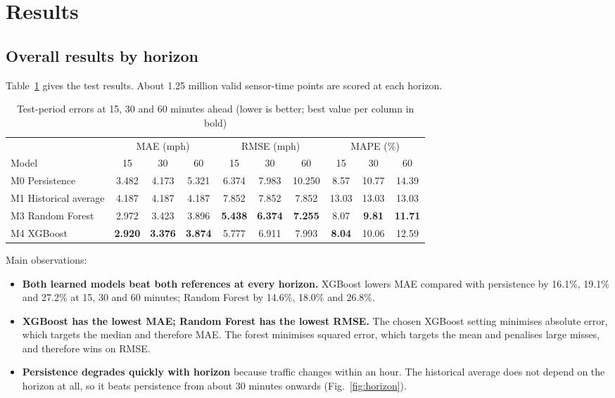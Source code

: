\documentclass[conference]{IEEEtran}
\begin{document}
\section{Results}
\label{sec:results}
\subsection{Overall results by horizon}
Table~\ref{tab:test} gives the test results. About 1.25 million valid sensor-time points are scored at each horizon.

\begin{table}[t]
\centering
\caption{Test-period errors at 15, 30 and 60 minutes ahead (lower is better; best value per column in bold)}
\label{tab:test}
\begin{tabular}{l ccc ccc ccc}
\toprule
& \multicolumn{3}{c}{MAE (mph)} & \multicolumn{3}{c}{RMSE (mph)} & \multicolumn{3}{c}{MAPE (\%)} \\
\cmidrule(lr){2-4}\cmidrule(lr){5-7}\cmidrule(lr){8-10}
Model & 15 & 30 & 60 & 15 & 30 & 60 & 15 & 30 & 60 \\
\midrule
M0 Persistence & 3.482 & 4.173 & 5.321 & 6.374 & 7.983 & 10.250 & 8.57 & 10.77 & 14.39 \\
M1 Historical average & 4.187 & 4.187 & 4.187 & 7.852 & 7.852 & 7.852 & 13.03 & 13.03 & 13.03 \\
M3 Random Forest & 2.972 & 3.423 & 3.896 & \textbf{5.438} & \textbf{6.374} & \textbf{7.255} & 8.07 & \textbf{9.81} & \textbf{11.71} \\
M4 XGBoost & \textbf{2.920} & \textbf{3.376} & \textbf{3.874} & 5.777 & 6.911 & 7.993 & \textbf{8.04} & 10.06 & 12.59 \\
\bottomrule
\end{tabular}
\end{table}

Main observations:
\begin{itemize}
\item \textbf{Both learned models beat both references at every horizon.} XGBoost lowers MAE compared with persistence by 16.1\%, 19.1\% and 27.2\% at 15, 30 and 60 minutes; Random Forest by 14.6\%, 18.0\% and 26.8\%.
\item \textbf{XGBoost has the lowest MAE; Random Forest has the lowest RMSE.} The chosen XGBoost setting minimises absolute error, which targets the median and therefore MAE. The forest minimises squared error, which targets the mean and penalises large misses, and therefore wins on RMSE.
\item \textbf{Persistence degrades quickly with horizon} because traffic changes within an hour. The historical average does not depend on the horizon at all, so it beats persistence from about 30 minutes onwards (Fig.~\ref{fig:horizon}).
\end{itemize}
\end{document}
